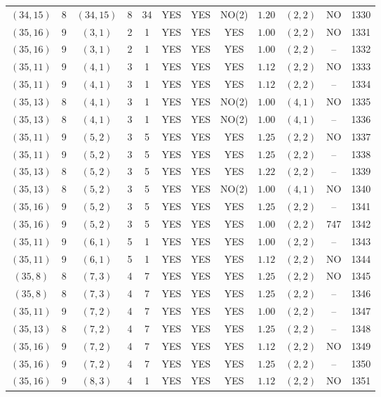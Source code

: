 \begin{longtable}{|c|c|c|c|c|c|c|c|c|c|c|c|}
$(34,15)$ & 8 & $(34,15)$ & 8 & 34 & YES & YES & NO(2) & $1.20$ & $(2,2)$ & NO & 1330\\
$(35,16)$ & 9 & $(3,1)$ & 2 & 1 & YES & YES & YES & $1.00$ & $(2,2)$ & NO & 1331\\
$(35,16)$ & 9 & $(3,1)$ & 2 & 1 & YES & YES & YES & $1.00$ & $(2,2)$ & -- & 1332\\
$(35,11)$ & 9 & $(4,1)$ & 3 & 1 & YES & YES & YES & $1.12$ & $(2,2)$ & NO & 1333\\
$(35,11)$ & 9 & $(4,1)$ & 3 & 1 & YES & YES & YES & $1.12$ & $(2,2)$ & -- & 1334\\
$(35,13)$ & 8 & $(4,1)$ & 3 & 1 & YES & YES & NO(2) & $1.00$ & $(4,1)$ & NO & 1335\\
$(35,13)$ & 8 & $(4,1)$ & 3 & 1 & YES & YES & NO(2) & $1.00$ & $(4,1)$ & -- & 1336\\
$(35,11)$ & 9 & $(5,2)$ & 3 & 5 & YES & YES & YES & $1.25$ & $(2,2)$ & NO & 1337\\
$(35,11)$ & 9 & $(5,2)$ & 3 & 5 & YES & YES & YES & $1.25$ & $(2,2)$ & -- & 1338\\
$(35,13)$ & 8 & $(5,2)$ & 3 & 5 & YES & YES & YES & $1.22$ & $(2,2)$ & -- & 1339\\
$(35,13)$ & 8 & $(5,2)$ & 3 & 5 & YES & YES & NO(2) & $1.00$ & $(4,1)$ & NO & 1340\\
$(35,16)$ & 9 & $(5,2)$ & 3 & 5 & YES & YES & YES & $1.25$ & $(2,2)$ & -- & 1341\\
$(35,16)$ & 9 & $(5,2)$ & 3 & 5 & YES & YES & YES & $1.00$ & $(2,2)$ & 747 & 1342\\
$(35,11)$ & 9 & $(6,1)$ & 5 & 1 & YES & YES & YES & $1.00$ & $(2,2)$ & -- & 1343\\
$(35,11)$ & 9 & $(6,1)$ & 5 & 1 & YES & YES & YES & $1.12$ & $(2,2)$ & NO & 1344\\
$(35,8)$ & 8 & $(7,3)$ & 4 & 7 & YES & YES & YES & $1.25$ & $(2,2)$ & NO & 1345\\
$(35,8)$ & 8 & $(7,3)$ & 4 & 7 & YES & YES & YES & $1.25$ & $(2,2)$ & -- & 1346\\
$(35,11)$ & 9 & $(7,2)$ & 4 & 7 & YES & YES & YES & $1.00$ & $(2,2)$ & -- & 1347\\
$(35,13)$ & 8 & $(7,2)$ & 4 & 7 & YES & YES & YES & $1.25$ & $(2,2)$ & -- & 1348\\
$(35,16)$ & 9 & $(7,2)$ & 4 & 7 & YES & YES & YES & $1.12$ & $(2,2)$ & NO & 1349\\
$(35,16)$ & 9 & $(7,2)$ & 4 & 7 & YES & YES & YES & $1.25$ & $(2,2)$ & -- & 1350\\
$(35,16)$ & 9 & $(8,3)$ & 4 & 1 & YES & YES & YES & $1.12$ & $(2,2)$ & NO & 1351\\

\end{longtable}
